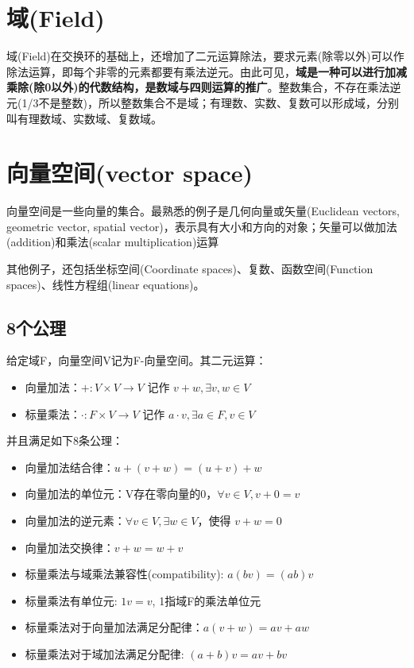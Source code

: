 \documentclass[12pt]{article}
\begin{document}
\section{域(Field)}
域(Field)在交换环的基础上，还增加了二元运算除法，要求元素(除零以外)可以作除法运算，即每个非零的元素都要有乘法逆元。由此可见，\textbf{域是一种可以进行加减乘除(除0以外)的代数结构，是数域与四则运算的推广}。整数集合，不存在乘法逆元(1/3不是整数)，所以整数集合不是域；有理数、实数、复数可以形成域，分别叫有理数域、实数域、复数域。

\section{向量空间(vector space)}
向量空间是一些向量的集合。最熟悉的例子是几何向量或矢量(Euclidean vectors, geometric vector, spatial vector)，表示具有大小和方向的对象；矢量可以做加法(addition)和乘法(scalar multiplication)运算

其他例子，还包括坐标空间(Coordinate spaces)、复数、函数空间(Function spaces)、线性方程组(linear equations)。

\subsection{8个公理}
给定域F，向量空间V记为F-向量空间。其二元运算：
\begin{itemize}
\setlength{\itemsep}{0pt}
\setlength{\parsep}{0pt}
\setlength{\parskip}{0pt}
\item 向量加法：$+ : V × V → V$ 记作 $v + w, \exists v, w \in V$
\item 标量乘法：$·: F × V → V$ 记作 $a \cdot v, \exists a \in F, v \in V$
\end{itemize}

并且满足如下8条公理：
\begin{itemize}
\setlength{\itemsep}{0pt}
\setlength{\parsep}{0pt}
\setlength{\parskip}{0pt}
\item 向量加法结合律：$u + (v + w) = (u + v) + w$
\item 向量加法的单位元：V存在零向量的0，$\forall v \in V , v + 0 = v$
\item 向量加法的逆元素：$\forall v \in V, \exists w \in V$，使得 $v + w = 0$
\item 向量加法交换律：$v + w = w + v$
\item 标量乘法与域乘法兼容性(compatibility): $a(b v) = (ab)v$
\item 标量乘法有单位元: $1 v = v$, 1指域F的乘法单位元
\item 标量乘法对于向量加法满足分配律：$a(v + w) = a v + a w$
\item 标量乘法对于域加法满足分配律: $(a + b)v = a v + b v$
\end{itemize}
\end{document}
